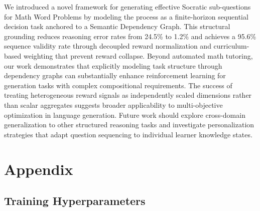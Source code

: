 \documentclass[sigconf, anonymous, review, screen]{acmart}
\begin{document}
We introduced a novel framework for generating effective Socratic sub-questions for Math Word Problems by modeling the process as a finite-horizon sequential decision task anchored to a Semantic Dependency Graph. This structural grounding reduces reasoning error rates from 24.5\% to 1.2\% and achieves a 95.6\% sequence validity rate through decoupled reward normalization and curriculum-based weighting that prevent reward collapse.
Beyond automated math tutoring, our work demonstrates that explicitly modeling task structure through dependency graphs can substantially enhance reinforcement learning for generation tasks with complex compositional requirements. The success of treating heterogeneous reward signals as independently scaled dimensions rather than scalar aggregates suggests broader applicability to multi-objective optimization in language generation. Future work should explore cross-domain generalization to other structured reasoning tasks and investigate personalization strategies that adapt question sequencing to individual learner knowledge states.
\label{sec:conclusion_end} %





\section{Appendix}


\subsection{Training Hyperparameters}
\end{document}
